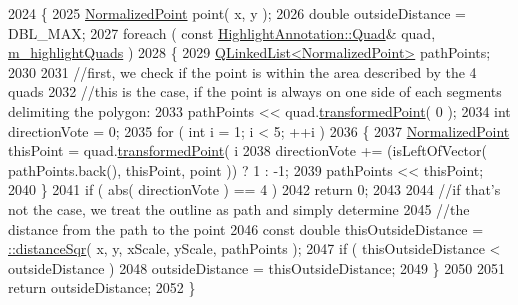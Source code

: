 \begin{DoxyCode}
2024 \{
2025     \hyperlink{classOkular_1_1NormalizedPoint}{NormalizedPoint} point( x, y );
2026     \textcolor{keywordtype}{double} outsideDistance = DBL\_MAX;
2027     \textcolor{keywordflow}{foreach} ( \textcolor{keyword}{const} \hyperlink{classOkular_1_1HighlightAnnotation_1_1Quad}{HighlightAnnotation::Quad}& quad, 
      \hyperlink{classOkular_1_1HighlightAnnotationPrivate_aa822b72c9bf0a2001ed17ce4bedb04f0}{m\_highlightQuads} )
2028     \{
2029         \hyperlink{classQLinkedList}{QLinkedList<NormalizedPoint>} pathPoints;
2030 
2031         \textcolor{comment}{//first, we check if the point is within the area described by the 4 quads}
2032         \textcolor{comment}{//this is the case, if the point is always on one side of each segments delimiting the polygon:}
2033         pathPoints << quad.\hyperlink{classOkular_1_1HighlightAnnotation_1_1Quad_acb6ab9f7ca3003937f7829941f5a0d52}{transformedPoint}( 0 );
2034         \textcolor{keywordtype}{int} directionVote = 0;
2035         \textcolor{keywordflow}{for} ( \textcolor{keywordtype}{int} i = 1; i < 5; ++i )
2036         \{
2037             \hyperlink{classOkular_1_1NormalizedPoint}{NormalizedPoint} thisPoint = quad.\hyperlink{classOkular_1_1HighlightAnnotation_1_1Quad_acb6ab9f7ca3003937f7829941f5a0d52}{transformedPoint}( i %
2038             directionVote += (isLeftOfVector( pathPoints.back(), thisPoint, point )) ? 1 : -1;
2039             pathPoints << thisPoint;
2040         \}
2041         \textcolor{keywordflow}{if} ( abs( directionVote ) == 4 )
2042             \textcolor{keywordflow}{return} 0;
2043 
2044         \textcolor{comment}{//if that's not the case, we treat the outline as path and simply determine}
2045         \textcolor{comment}{//the distance from the path to the point}
2046         \textcolor{keyword}{const} \textcolor{keywordtype}{double} thisOutsideDistance = \hyperlink{classOkular_1_1HighlightAnnotationPrivate_a8285cfe8a18e00cd14eb2dee6972d800}{::distanceSqr}( x, y, xScale, yScale, pathPoints );
2047         \textcolor{keywordflow}{if} ( thisOutsideDistance < outsideDistance )
2048             outsideDistance = thisOutsideDistance;
2049     \}
2050 
2051     \textcolor{keywordflow}{return} outsideDistance;
2052 \}
\end{DoxyCode}
